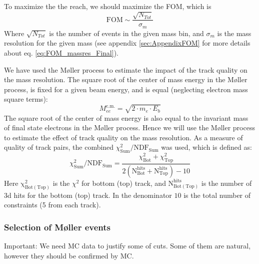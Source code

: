 \documentclass[letterpaper,12pt]{article}
\def \dstl {\displaystyle}
\def \Mlr {M\o ller }
\begin{document}
To maximize the the reach, we should maximize the FOM, which is 
\begin{equation}
 \mathrm{FOM} \sim \frac{\dstl \sqrt{N_{Tot}}}{\dstl \sigma_{m}}
 \label{eq:FOM_massres_Final}
\end{equation}
Where $\dstl \sqrt{N_{Tot}}$ is the number of events in the given mass bin, and 
$\dstl \sigma_{m}$ is the mass resolution for the given mass (see appendix \ref{sec:AppendixFOM} for more details about eq. \ref{eq:FOM_massres_Final}).

We have used the \Mlr process to estimate the impact of the track quality on the mass resolution. The square root of the center of mass energy in the \Mlr process, is fixed for a given beam energy, and is equal (neglecting electron mass square terms):
\begin{equation}
 \dstl M_{ee}^{\mathrm{c.m.}} = \sqrt{2\cdot m_{e}\cdot E_{b}}
\end{equation}
The square root of the center of mass energy is also equal to the invariant mass of final state electrons in the \Mlr process. Hence we will use the \Mlr process to estimate the effect of track quality on the mass resolution. As a measure of quality of track pairs, the  combined $\chi^{2}_{\mathrm{Sum}}/\mathrm{NDF_{Sum}}$ was used, which is defined as:
\begin{equation}
    \chi^{2}_{\mathrm{Sum}}/\mathrm{NDF_{Sum}} = \frac{\dstl \chi^{2}_{ \mathrm{Bot}} + \chi^{2}_{\mathrm{Top}} }{ \mathrm{\dstl 2\left(N_{Bot}^{hits} + N_{Top}^{hits}\right) - 10}}
\end{equation}
Here $\mathrm{\chi^{2}_{Bot(Top)}}$ is the $\chi^{2}$ for bottom (top) track, and 
$\mathrm{ N^{hits}_{Bot(Top) } }$ is the number of 3d hits for the bottom (top) track.
In the denominator $10$ is the total number of constraints (5 from each track).

\subsubsection{Selection of \Mlr events}
{\color{Red} Important: We need MC data to justify some of cuts. Some of them are natural, however they should be confirmed by MC.}
\end{document}
